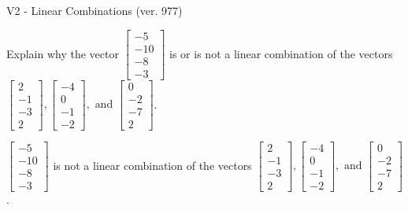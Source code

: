 \begin{exercise}
  \begin{exerciseTitle}V2 - Linear Combinations (ver. 977)\end{exerciseTitle}
  \begin{exerciseStatement}
    Explain why the vector \(\left[\begin{array}{c}
-5 \\
-10 \\
-8 \\
-3
\end{array}\right]\)  is or is not a linear 
	combination of the vectors \(\left[\begin{array}{c}
2 \\
-1 \\
-3 \\
2
\end{array}\right] , \left[\begin{array}{c}
-4 \\
0 \\
-1 \\
-2
\end{array}\right] , \text{ and } \left[\begin{array}{c}
0 \\
-2 \\
-7 \\
2
\end{array}\right]\).
	


  \end{exerciseStatement}
  \begin{exerciseAnswer}
   \(\left[\begin{array}{c}
-5 \\
-10 \\
-8 \\
-3
\end{array}\right]\) 
  	 is not  
	a linear combination of the vectors \(\left[\begin{array}{c}
2 \\
-1 \\
-3 \\
2
\end{array}\right] , \left[\begin{array}{c}
-4 \\
0 \\
-1 \\
-2
\end{array}\right] , \text{ and } \left[\begin{array}{c}
0 \\
-2 \\
-7 \\
2
\end{array}\right]\).

	
  


  \end{exerciseAnswer}
\end{exercise}